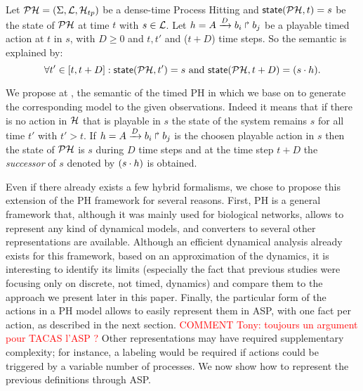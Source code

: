 \begin{definition}
\label{def:semantic}
Let $\mathcal{PH} = (\Sigma,\mathcal{L},\mathcal{H}_{tp})$ be a dense-time Process Hitting and $\textsf{state}(\mathcal{PH}, t)=s$ be the state of $\mathcal{PH}$ at time $t$ with $s \in \mathcal{L}$. Let $h = A\xrightarrow{D} b_i \Rsh b_j$ be a playable timed action at $t$ in $s$, with $D \geq 0 $ and $t, t'$ and ($t+D$) time steps. So the semantic is explained by:
$$ \forall t' \in [t, t+D ] : \textsf{state}(\mathcal{PH}, t')=s \text{ and } \textsf{state}(\mathcal{PH}, t+D)=(s \cdot h).$$
\end{definition}

We propose at , the semantic of the timed PH in which we base on to generate the corresponding model to the given observations. Indeed it means that if there is no action in $\mathcal{H}$ that is playable in $s$ the state of the system remains $s$ for all time $t'$ with $t' > t$.%
If $h = A\xrightarrow{D} b_i \Rsh b_j$ is the choosen playable action in $s$ then the state of $\mathcal{PH}$ is $s$ during $D$ time steps and at the time step $t+D$
the \emph{successor} of $s$ denoted by $(s \cdot h)$ is obtained.

Even if there already exists a few hybrid formalisms, we chose to propose this extension of the PH framework for several reasons.
First, PH is a general framework that,
although it was mainly used for biological networks,
allows to represent any kind of dynamical models,
and converters to several other representations are available. %
Although an efficient dynamical analysis already exists for this framework,
based on an approximation of the dynamics,
it is interesting to identify its limits (especially the fact that previous studies were focusing only on discrete, not timed, dynamics)
and compare them to the approach we present later in this paper.
Finally, the particular form of the actions in a  PH model allows
to easily represent them in ASP,
with one fact per action, as described in the next section.
\textcolor{red}{COMMENT Tony: toujours un argument pour TACAS l'ASP ?}
Other representations may have required supplementary complexity;
for instance, a labeling would be required
if actions could be triggered by a variable number of processes.
We now show how to represent the previous definitions through ASP.

